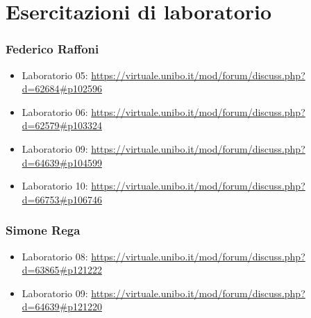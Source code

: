 \documentclass[a4paper,12pt]{report}
\begin{document}
\chapter{Esercitazioni di laboratorio}

\subsection{Federico Raffoni}

\begin{itemize}
 \item Laboratorio 05: \url{https://virtuale.unibo.it/mod/forum/discuss.php?d=62684#p102596}
 \item Laboratorio 06: \url{https://virtuale.unibo.it/mod/forum/discuss.php?d=62579#p103324}
 \item Laboratorio 09: \url{https://virtuale.unibo.it/mod/forum/discuss.php?d=64639#p104599}
 \item Laboratorio 10: \url{https://virtuale.unibo.it/mod/forum/discuss.php?d=66753#p106746}
\end{itemize}

\subsection{Simone Rega}

\begin{itemize}
	\item Laboratorio 08: \url{https://virtuale.unibo.it/mod/forum/discuss.php?d=63865#p121222}
	\item Laboratorio 09: \url{https://virtuale.unibo.it/mod/forum/discuss.php?d=64639#p121220}
\end{itemize}




\end{document}
